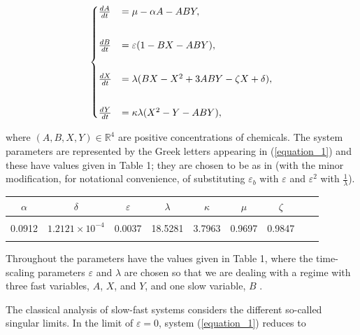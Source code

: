 \documentclass{ws-ijbc}
\begin{document}
\begin{equation}
\begin{aligned}
\begin{cases}
\frac{dA}{dt} &= \mu - \alpha A - ABY, \\ \vspace{2mm}\\
\frac{dB}{dt} &= \varepsilon(1-BX - ABY), \\ \vspace{2mm}\\
\frac{dX}{dt} &= \lambda(BX - X^2 +3ABY - \zeta X + \delta), \\ \vspace{2mm}\\
\frac{dY}{dt} &= \kappa\lambda(X^2 - Y - ABY),
\end{cases}
\end{aligned}
\label{equation_1}
\end{equation}
    
\noindent
where $(A, B, X, Y)\in\mathbb{R}^{4}$ are positive concentrations of chemicals.  The system parameters are represented by the Greek letters appearing in (\ref{equation_1}) and these have values given in Table 1; they are chosen to be as in \cite{Rescaling} (with the minor modification, for notational convenience, of substituting  $\varepsilon_{b}$ with $\varepsilon$ and $\varepsilon^{2}$ with $\frac{1}{\lambda}$).

\begin{table}[h]
{\begin{tabular}{c  c  c  c  c  c  c  c  c} \\[-2pt]
\toprule
$\alpha$ & $\delta$ & $\varepsilon$ & $\lambda$ & $\kappa$ & $\mu$ & $\zeta$ \\[6pt]
\hline\\[-2pt]
0.0912 & $1.2121 \times 10^{-4}$ & 0.0037 & 18.5281 & 3.7963 & 0.9697 & 0.9847\\[1pt]
\botrule
\end{tabular}}
\end{table}

Throughout the parameters have the values given in Table 1, where the time-scaling parameters $\varepsilon$ and $\lambda$ are chosen so that we are dealing with a regime with three fast variables, $A$, $X$, and $Y$, and one slow variable, $B$ \cite{Rescaling}.
    
The classical analysis of slow-fast systems considers the different so-called singular limits.  In the limit of $\varepsilon = 0$, system (\ref{equation_1}) reduces to
    
\end{document}
